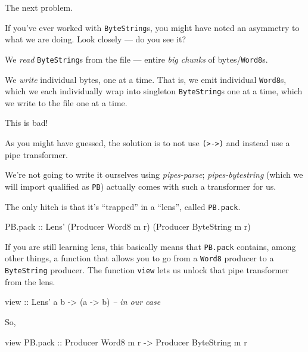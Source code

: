 \documentclass[]{article}
\newenvironment{Shaded}{}{}
\newcommand{\DataTypeTok}[1]{\textcolor[rgb]{0.56,0.13,0.00}{{#1}}}
\newcommand{\CommentTok}[1]{\textcolor[rgb]{0.38,0.63,0.69}{\textit{{#1}}}}
\newcommand{\OtherTok}[1]{\textcolor[rgb]{0.00,0.44,0.13}{{#1}}}
\newcommand{\NormalTok}[1]{{#1}}
\begin{document}
The next problem.

If you've ever worked with \texttt{ByteString}s, you might have noted an
asymmetry to what we are doing. Look closely --- do you see it?

We \emph{read} \texttt{ByteString}s from the file --- entire \emph{big
chunks} of bytes/\texttt{Word8}s.

We \emph{write} individual bytes, one at a time. That is, we emit
individual \texttt{Word8}s, which we each individually wrap into
singleton \texttt{ByteString}s one at a time, which we write to the file
one at a time.

This is bad!

As you might have guessed, the solution is to not use
\texttt{(\textgreater{}-\textgreater{})} and instead use a pipe
transformer.

We're not going to write it ourselves using \emph{pipes-parse};
\emph{pipes-bytestring} (which we will import qualified as \texttt{PB})
actually comes with such a transformer for us.

The only hitch is that it's ``trapped'' in a ``lens'', called
\texttt{PB.pack}.

\begin{Shaded}
\begin{Highlighting}[]
\NormalTok{PB.pack}\OtherTok{ ::} \DataTypeTok{Lens'} \NormalTok{(}\DataTypeTok{Producer} \DataTypeTok{Word8} \NormalTok{m r) (}\DataTypeTok{Producer} \DataTypeTok{ByteString} \NormalTok{m r)}
\end{Highlighting}
\end{Shaded}

If you are still learning lens, this basically means that
\texttt{PB.pack} contains, among other things, a function that allows
you to go from a \texttt{Word8} producer to a \texttt{ByteString}
producer. The function \texttt{view} lets us unlock that pipe
transformer from the lens.

\begin{Shaded}
\begin{Highlighting}[]
\OtherTok{view ::} \DataTypeTok{Lens'} \NormalTok{a b }\OtherTok{->} \NormalTok{(a }\OtherTok{->} \NormalTok{b)       }\CommentTok{-- in our case}
\end{Highlighting}
\end{Shaded}

So,

\begin{Shaded}
\begin{Highlighting}[]
\NormalTok{view PB.pack}\OtherTok{ ::} \DataTypeTok{Producer} \DataTypeTok{Word8}      \NormalTok{m r}
             \OtherTok{->} \DataTypeTok{Producer} \DataTypeTok{ByteString} \NormalTok{m r}
\end{Highlighting}
\end{Shaded}
\end{document}
